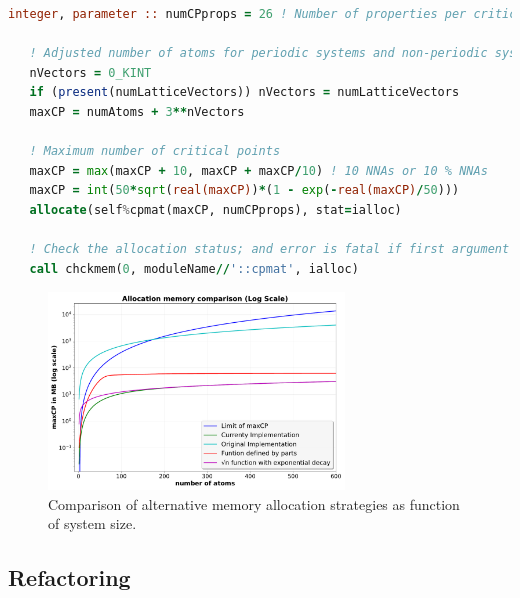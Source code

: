 \newpage
\vspace*{1.0cm}%
\begin{lstlisting}[language=Fortran, style=mystyle]
   integer, parameter :: numCPprops = 26 ! Number of properties per critical point

   ! Adjusted number of atoms for periodic systems and non-periodic systems                                                         
   nVectors = 0_KINT 
   if (present(numLatticeVectors)) nVectors = numLatticeVectors                                                                     
   maxCP = numAtoms + 3**nVectors                                                                                                   
                                                                                                                                           
   ! Maximum number of critical points                                                                                              
   maxCP = max(maxCP + 10, maxCP + maxCP/10) ! 10 NNAs or 10 % NNAs                                                     
   maxCP = int(50*sqrt(real(maxCP))*(1 - exp(-real(maxCP)/50)))                                                                        
   allocate(self%cpmat(maxCP, numCPprops), stat=ialloc) 

   ! Check the allocation status; and error is fatal if first argument is 0
   call chckmem(0, moduleName//'::cpmat', ialloc)
\end{lstlisting}

\begin{figure}[h]
  \centering
  \includegraphics[width=0.7\textwidth]{img/memory_optimisation_curve.pdf}
  \caption{Comparison of alternative memory allocation strategies as
           function of system size.}
  \label{memory_strategies}
\end{figure}

\newpage
\subsection{Refactoring}

